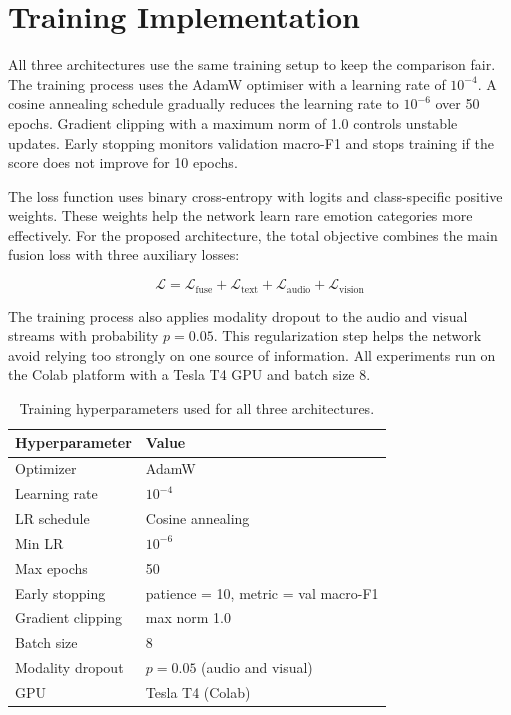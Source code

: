 \section{Training Implementation}

\label{sec:training_impl}

All three architectures use the same training setup to keep the comparison fair. The training process uses the AdamW optimiser with a learning rate of $10^{-4}$. A cosine annealing schedule gradually reduces the learning rate to $10^{-6}$ over 50 epochs. Gradient clipping with a maximum norm of 1.0 controls unstable updates. Early stopping monitors validation macro-F1 and stops training if the score does not improve for 10 epochs.

The loss function uses binary cross-entropy with logits and class-specific positive weights. These weights help the network learn rare emotion categories more effectively. For the proposed architecture, the total objective combines the main fusion loss with three auxiliary losses:

\begin{equation}
\mathcal{L} = \mathcal{L}_{\mathrm{fuse}} + \mathcal{L}_{\mathrm{text}} + \mathcal{L}_{\mathrm{audio}} + \mathcal{L}_{\mathrm{vision}}
\end{equation}

The training process also applies modality dropout to the audio and visual streams with probability $p = 0.05$. This regularization step helps the network avoid relying too strongly on one source of information. All experiments run on the Colab platform with a Tesla T4 GPU and batch size 8.

\begin{table}[H]
\centering
\caption{Training hyperparameters used for all three architectures.}
\begin{tabular}{ll}
\hline
\textbf{Hyperparameter} & \textbf{Value} \\
\hline
Optimizer        & AdamW \\
Learning rate    & $10^{-4}$ \\
LR schedule      & Cosine annealing \\
Min LR           & $10^{-6}$ \\
Max epochs       & 50 \\
Early stopping   & patience = 10, metric = val macro-F1 \\
Gradient clipping & max norm 1.0 \\
Batch size       & 8 \\
Modality dropout & $p = 0.05$ (audio and visual) \\
GPU              & Tesla T4 (Colab) \\
\hline
\end{tabular}
\label{tab:hyperparams}
\end{table}

